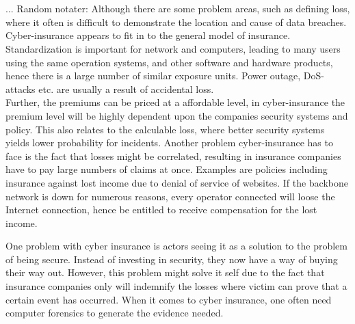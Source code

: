  


 



\\
\\
... Random notater:
 Although there are some problem areas, such as defining loss, where it often is difficult to
  demonstrate the location and cause of data breaches. Cyber-insurance appears to fit in to
   the general model of insurance. Standardization is important for network and computers, leading to
    many users using the same operation systems, and other software and hardware products, 
    hence there is a large number of similar exposure units. Power outage, DoS-attacks etc. 
    are usually a result of accidental loss.
 \\ Further, the premiums can be priced at a affordable level, in cyber-insurance the premium level
  will be highly dependent upon the companies security systems and policy.
   This also relates to the calculable loss, where better security systems
    yields lower probability for incidents. \cite{robinson2012incentives}
 Another problem cyber-insurance has to face is the fact that losses might be correlated, 
 resulting in insurance companies have to pay large numbers of claims at once. Examples are 
 policies including insurance against lost income due to denial of service of websites. 
 If the backbone network is down for numerous reasons, 
 every operator connected will loose the Internet connection, 
 hence be entitled to receive compensation for the lost income.   

 
   

 One problem with cyber insurance is actors seeing it as a solution to the problem of being secure. Instead of investing in security, they now have a way of buying their way out. However, this problem might solve it self due to the fact that insurance companies only will indemnify the losses where victim can prove that a certain event has occurred. When it comes to cyber insurance, one often need computer forensics to generate the evidence needed. 









